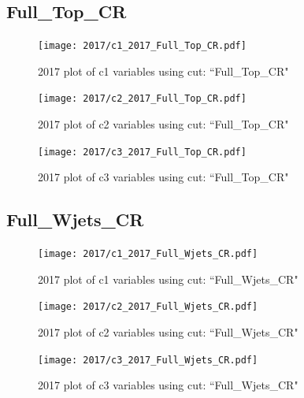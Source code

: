\documentclass{article}
\begin{document}
      \subsection*{Full\_Top\_CR}
                        \begin{figure}[H]
                            \centering
                            \caption{2017 plot of c1 variables using cut: ``Full\_Top\_CR"}
                            \texttt{[image: 2017/c1\_2017\_Full\_Top\_CR.pdf]}
                        \end{figure}    
                        \begin{figure}[H]
                            \centering
                            \caption{2017 plot of c2 variables using cut: ``Full\_Top\_CR"}
                            \texttt{[image: 2017/c2\_2017\_Full\_Top\_CR.pdf]}
                        \end{figure}    
                        \begin{figure}[H]
                            \centering
                            \caption{2017 plot of c3 variables using cut: ``Full\_Top\_CR"}
                            \texttt{[image: 2017/c3\_2017\_Full\_Top\_CR.pdf]}
                        \end{figure}    
      \subsection*{Full\_Wjets\_CR}
                        \begin{figure}[H]
                            \centering
                            \caption{2017 plot of c1 variables using cut: ``Full\_Wjets\_CR"}
                            \texttt{[image: 2017/c1\_2017\_Full\_Wjets\_CR.pdf]}
                        \end{figure}    
                        \begin{figure}[H]
                            \centering
                            \caption{2017 plot of c2 variables using cut: ``Full\_Wjets\_CR"}
                            \texttt{[image: 2017/c2\_2017\_Full\_Wjets\_CR.pdf]}
                        \end{figure}    
                        \begin{figure}[H]
                            \centering
                            \caption{2017 plot of c3 variables using cut: ``Full\_Wjets\_CR"}
                            \texttt{[image: 2017/c3\_2017\_Full\_Wjets\_CR.pdf]}
                        \end{figure}    
\end{document}
